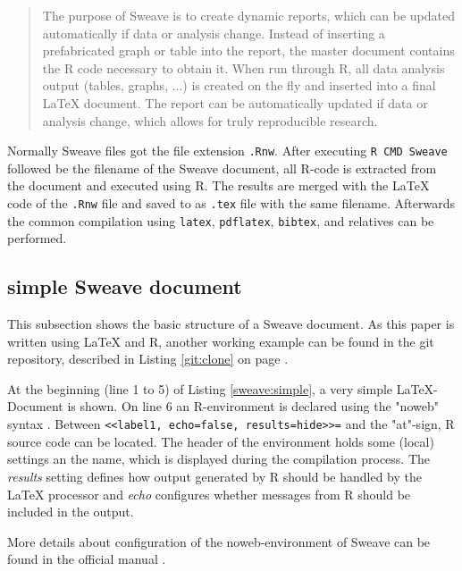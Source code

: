 \documentclass{ifacconf}
\begin{document}
\begin{quotation}
The purpose of Sweave is to create dynamic reports, 
which can be updated automatically if data or
analysis change. Instead of inserting a prefabricated
graph or table into the report, the master document
contains the R code necessary to obtain it. When run
through R, all data analysis output (tables, graphs, ...) 
is created on the fly and inserted into a final \LaTeX{}
document. The report can be automatically updated
if data or analysis change, which allows for truly reproducible research.
\end{quotation}

Normally Sweave files got the file extension \texttt{.Rnw}. 
After executing \texttt{R CMD Sweave} followed be the filename
of the Sweave document, all R-code is extracted from the document and executed using R.
The results are merged with the \LaTeX{} code of the \texttt{.Rnw} file and saved
to as \texttt{.tex} file with the same filename. Afterwards the common 
compilation using \texttt{latex}, \texttt{pdflatex}, \texttt{bibtex}, and relatives
can be performed.

\subsection{simple Sweave document}

This subsection shows the basic structure of a Sweave document. As this
paper is written using \LaTeX{} and R, another working example can be found
in the git repository, described in Listing \ref{git:clone} on page
\pageref{git:clone}.

At the beginning (line 1 to 5) of Listing \ref{sweave:simple}, a very simple
\LaTeX-Document is shown. On line 6 an R-environment is declared using 
the "noweb" syntax \citep{Ramsey_1994, Johnson_Johnson_2000}.
Between \newline \texttt{<<label1, echo=false, results=hide>>=} \newline and the
"at"-sign, R source code can be located. The header of the environment holds
some (local) settings an the name, which is displayed during the
compilation process. The \textit{results} setting defines how
output generated by R should be handled by the \LaTeX{} processor and \textit{echo}
configures whether messages from R should be included in the output.

More details about configuration of the noweb-environment of Sweave can
be found in the official manual \citep{SweaveManual}.
\end{document}
